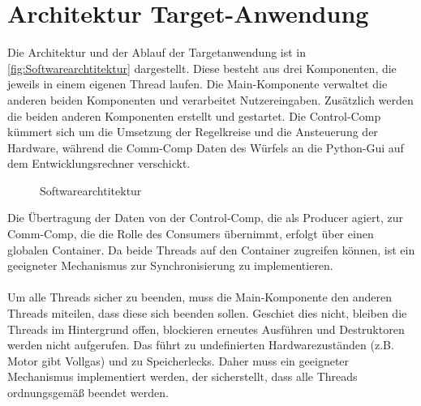     \section{Architektur Target-Anwendung}
        Die Architektur und der Ablauf der Targetanwendung ist in \autoref{fig:Softwarearchtitektur} dargestellt. Diese besteht aus drei Komponenten, die jeweils in einem eigenen Thread laufen. Die Main-Komponente verwaltet die anderen beiden Komponenten und verarbeitet Nutzereingaben. Zusätzlich werden die beiden anderen Komponenten erstellt und gestartet. Die Control-Comp kümmert sich um die Umsetzung der Regelkreise und die Ansteuerung der Hardware, während die Comm-Comp Daten des Würfels an die Python-Gui auf dem Entwicklungsrechner verschickt.
        \begin{figure}[H]
            \centering
                \def\svgwidth{\linewidth} 
                
            \caption{Softwarearchtitektur}
            \label{fig:Softwarearchtitektur}
        \end{figure}
        Die Übertragung der Daten von der Control-Comp, die als Producer agiert, zur Comm-Comp, die die Rolle des Consumers übernimmt, erfolgt über einen globalen Container. Da beide Threads auf den Container zugreifen können, ist ein geeigneter Mechanismus zur Synchronisierung zu implementieren.\\
        \\
        Um alle Threads sicher zu beenden, muss die Main-Komponente den anderen Threads miteilen, dass diese sich beenden sollen. Geschiet dies nicht, bleiben die Threads im Hintergrund offen, blockieren erneutes Ausführen und Destruktoren werden nicht aufgerufen. Das führt zu undefinierten Hardwarezuständen (z.B. Motor gibt Vollgas) und zu Speicherlecks. Daher muss ein geeigneter Mechanismus implementiert werden, der sicherstellt, dass alle Threads ordnungsgemäß beendet werden.\\
        \\
